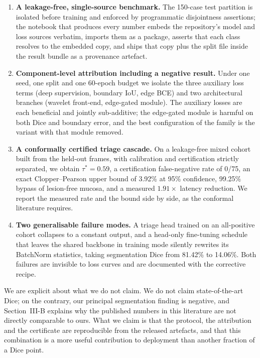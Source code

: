 \documentclass[journal]{IEEEtran}
\begin{document}
\begin{enumerate}
\item \textbf{A leakage-free, single-source benchmark.} The 150-case test partition is isolated before training and enforced by programmatic disjointness assertions; the notebook that produces every number embeds the repository's model and loss sources verbatim, imports them as a package, asserts that each class resolves to the embedded copy, and ships that copy plus the split file inside the result bundle as a provenance artefact.
\item \textbf{Component-level attribution including a negative result.} Under one seed, one split and one 60-epoch budget we isolate the three auxiliary loss terms (deep supervision, boundary IoU, edge BCE) and two architectural branches (wavelet front-end, edge-gated module). The auxiliary losses are each beneficial and jointly sub-additive; the edge-gated module is harmful on both Dice and boundary error, and the best configuration of the family is the variant with that module removed.
\item \textbf{A conformally certified triage cascade.} On a leakage-free mixed cohort built from the held-out frames, with calibration and certification strictly separated, we obtain $\tau^{*}=0.59$, a certification false-negative rate of 0/75, an exact Clopper--Pearson upper bound of 3.92\% at 95\% confidence, 99.25\% bypass of lesion-free mucosa, and a measured $1.91\times$ latency reduction. We report the measured rate and the bound side by side, as the conformal literature requires.
\item \textbf{Two generalisable failure modes.} A triage head trained on an all-positive cohort collapses to a constant output, and a head-only fine-tuning schedule that leaves the shared backbone in training mode silently rewrites its BatchNorm statistics, taking segmentation Dice from 81.42\% to 14.06\%. Both failures are invisible to loss curves and are documented with the corrective recipe.
\end{enumerate}

We are explicit about what we do not claim. We do not claim state-of-the-art Dice; on the contrary, our principal segmentation finding is negative, and Section~III-B explains why the published numbers in this literature are not directly comparable to ours. What we claim is that the protocol, the attribution and the certificate are reproducible from the released artefacts, and that this combination is a more useful contribution to deployment than another fraction of a Dice point.
\end{document}
